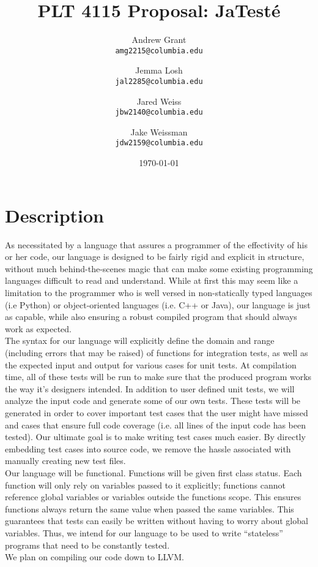 \documentclass{article}
\title{PLT 4115 Proposal: \textbf{JaTest\'{e}}}
\author{
	Andrew Grant\\
	\texttt{amg2215@columbia.edu}
	\and
	Jemma Losh\\
	\texttt{jal2285@columbia.edu}
	\and
	Jared Weiss\\
	\texttt{jbw2140@columbia.edu}
	\and
	Jake Weissman\\
	\texttt{jdw2159@columbia.edu}
}
\date{\today}
\begin{document}
\maketitle

\section{Description}
As necessitated by a language that assures a programmer of the effectivity of his or her code, our language is designed to be fairly rigid and explicit in structure, without much behind-the-scenes magic that can make some existing programming languages difficult to read and understand. While at first this may seem like a limitation to the programmer who is well versed in non-statically typed languages (i.e Python) or object-oriented languages (i.e. C++ or Java), our language is just as capable, while also ensuring a robust compiled program that should always work as expected. 
\\
The syntax for our language will explicitly define the domain and range (including errors that may be raised) of functions for integration tests, as well as the expected input and output for various cases for unit tests. At compilation time, all of these tests will be run to make sure that the produced program works the way it's designers intended. In addition to user defined unit tests, we will analyze the input code and generate some of our own tests. These tests will be generated in order to cover important test cases that the user might have missed and cases that ensure full code coverage (i.e. all lines of the input code has been tested). Our ultimate goal is to make writing test cases much easier. By directly embedding test cases into source code, we remove the hassle associated with manually creating new test files. 
\\
Our language will be functional. Functions will be given first class status. Each function will only rely on variables passed to it explicitly; functions cannot reference global variables or variables outside the functions scope. This ensures functions always return the same value when passed the same variables. This guarantees that tests can easily be written without having to worry about global variables. Thus, we intend for our language to be used to write ``stateless'' programs that need to be constantly tested. 
\\
We plan on compiling our code down to LLVM. 
\end{document}
